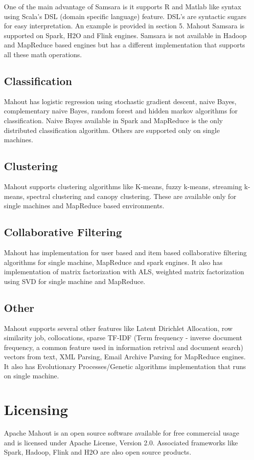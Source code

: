 \documentclass[9pt,twocolumn,twoside]{../../styles/osajnl}
\begin{document}
One of the main advantage of Samsara is it supports R and Matlab like
syntax using Scala's DSL (domain specific language) feature. DSL's are
syntactic sugars for easy interpretation. An example is provided in
section 5. Mahout Samsara is supported on Spark, H2O and Flink
engines. Samsara is not available in Hadoop and MapReduce based
engines but has a different implementation that supports all these math
operations.

\subsection{Classification}
Mahout has logistic regression using stochastic gradient descent,
naive Bayes, complementary naive Bayes, random forest and hidden
markov algorithms for classification. Naive Bayes available in Spark
and MapReduce is the only distributed classification algorithm. Others
are supported only on single machines.

\subsection{Clustering}
Mahout supports clustering algorithms like K-means, fuzzy k-means,
streaming k-means, spectral clustering and canopy clustering. These
are available only for single machines and MapReduce based
environments.

\subsection{Collaborative Filtering}
Mahout has implementation for user based and item based collaborative
filtering algorithms for single machine, MapReduce and spark
engines. It also has implementation of matrix factorization with ALS,
weighted matrix factorization using SVD for single machine and
MapReduce.

\subsection{Other}
Mahout supports several other features like Latent Dirichlet
Allocation, row similarity job, collocations, sparse TF-IDF (Term
frequency - inverse document frequency, a common feature used in
information retrival and document search) vectors from text, XML
Parsing, Email Archive Parsing for MapReduce engines. It also has
Evolutionary Processes/Genetic algorithms implementation that runs on
single machine.

\section{Licensing}
Apache Mahout is an open source software available for free commercial
usage and is licensed under Apache License, Version
2.0\cite{www-mahoutLicense}. Associated frameworks like Spark,
  Hadoop, Flink and H2O are also open source products.
\end{document}
